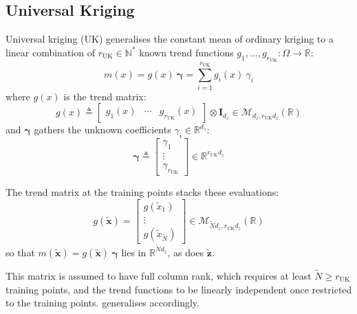 \subsection{Universal Kriging}

Universal kriging (UK) \cite{bib:universal-kriging} generalises the constant mean of ordinary kriging to a linear combination of $r_{\mathrm{UK}}\in\mathbb{N}^*$ known trend functions $g_1,\dots,g_{r_{\mathrm{UK}}}:\Omega\to\mathbb{R}$:
\begin{equation}
	m(x)=g(x)\:\boldsymbol{\gamma}=\sum_{i=1}^{r_{\mathrm{UK}}}g_i(x)\:\gamma_i\label{eq:UK_mean}
\end{equation}
where $g(x)$ is the trend matrix:
\begin{equation}
	g(x)\triangleq\begin{bmatrix}g_1(x)&\cdots&g_{r_{\mathrm{UK}}}(x)\end{bmatrix}\otimes \mathbf{I}_{d_z}\in\mathcal{M}_{d_z,r_{\mathrm{UK}}d_z}(\mathbb{R})
\end{equation}
and $\boldsymbol{\gamma}$ gathers the unknown coefficients $\gamma_i\in\mathbb{R}^{d_z}$:
\begin{equation}
	\boldsymbol{\gamma}\triangleq\begin{bmatrix}
	\gamma_1\\\vdots\\\gamma_{r_{\mathrm{UK}}}
	\end{bmatrix}\in\mathbb{R}^{r_{\mathrm{UK}}d_z}
\end{equation}

The trend matrix at the training points stacks these evaluations:
\begin{equation}
	g(\tilde{\mathbf{x}})=\begin{bmatrix}
	g(\tilde{x}_1)\\\vdots\\g(\tilde{x}_{\tilde{N}})
	\end{bmatrix}\in\mathcal{M}_{\tilde{N}d_z,r_{\mathrm{UK}}d_z}(\mathbb{R})
\end{equation}
so that $m(\tilde{\mathbf{x}})=g(\tilde{\mathbf{x}})\:\boldsymbol{\gamma}$ lies in $\mathbb{R}^{\tilde{N}d_z}$, as does $\tilde{\mathbf{z}}$.

This matrix is assumed to have full column rank, which requires at least $\tilde{N}\geq r_{\mathrm{UK}}$ training points, and the trend functions to be linearly independent once restricted to the training points.  generalises  accordingly.

